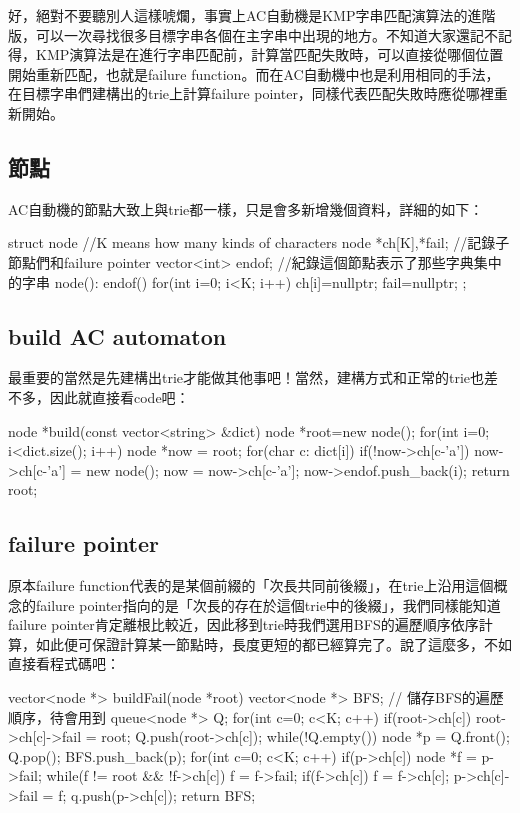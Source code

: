 好，絕對不要聽別人這樣唬爛，事實上AC自動機是KMP字串匹配演算法的進階版，可以一次尋找很多目標字串各個在主字串中出現的地方。不知道大家還記不記得，KMP演算法是在進行字串匹配前，計算當匹配失敗時，可以直接從哪個位置開始重新匹配，也就是failure function。而在AC自動機中也是利用相同的手法，在目標字串們建構出的trie上計算failure pointer，同樣代表匹配失敗時應從哪裡重新開始。
\subsection{節點}
AC自動機的節點大致上與trie都一樣，只是會多新增幾個資料，詳細的如下：
\begin{C++}
struct node{ //K means how many kinds of characters
	node *ch[K],*fail; //記錄子節點們和failure pointer
	vector<int> endof; //紀錄這個節點表示了那些字典集中的字串
	node(): endof(){
		for(int i=0; i<K; i++) ch[i]=nullptr;
		fail=nullptr;
	}
};
\end{C++}
\subsection{build AC automaton}
最重要的當然是先建構出trie才能做其他事吧！當然，建構方式和正常的trie也差不多，因此就直接看code吧：
\begin{C++}
node *build(const vector<string> &dict) {
    node *root=new node();
    for(int i=0; i<dict.size(); i++) {
		node *now = root;
		for(char c: dict[i]) {
			if(!now->ch[c-'a'])
				now->ch[c-'a'] = new node();
			now = now->ch[c-'a'];
		}
		now->endof.push_back(i);
    }
    return root;
}
\end{C++}
\subsection{failure pointer}
原本failure function代表的是某個前綴的「次長共同前後綴」，在trie上沿用這個概念的failure pointer指向的是「次長的存在於這個trie中的後綴」，我們同樣能知道failure pointer肯定離根比較近，因此移到trie時我們選用BFS的遍歷順序依序計算，如此便可保證計算某一節點時，長度更短的都已經算完了。說了這麼多，不如直接看程式碼吧：
\begin{C++}
vector<node *> buildFail(node *root) {
	vector<node *> BFS; // 儲存BFS的遍歷順序，待會用到
	queue<node *> Q;
	for(int c=0; c<K; c++) {
		if(root->ch[c]) {
			root->ch[c]->fail = root;
			Q.push(root->ch[c]);
		}
	}
	while(!Q.empty()) {
		node *p = Q.front(); Q.pop();
		BFS.push_back(p);
		for(int c=0; c<K; c++) if(p->ch[c]) {
			node *f = p->fail;
			while(f != root && !f->ch[c]) f = f->fail;
			if(f->ch[c]) f = f->ch[c];
			p->ch[c]->fail = f;
			q.push(p->ch[c]);
		}
	}
	return BFS;
}
\end{C++}
